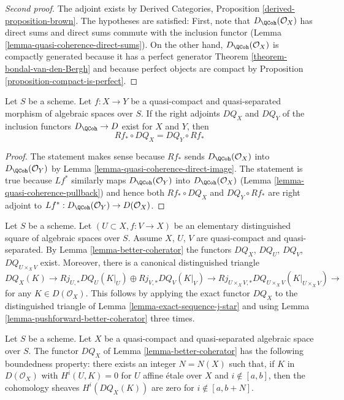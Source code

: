 \begin{proof}[Second proof]
The adjoint exists by Derived Categories, Proposition
\ref{derived-proposition-brown}. The hypotheses are satisfied:
First, note that $D_\QCoh(\mathcal{O}_X)$ has direct sums
and direct sums commute with the inclusion functor
(Lemma \ref{lemma-quasi-coherence-direct-sums}).
On the other hand, $D_\QCoh(\mathcal{O}_X)$
is compactly generated because it has a perfect
generator Theorem \ref{theorem-bondal-van-den-Bergh}
and because perfect objects are compact by
Proposition \ref{proposition-compact-is-perfect}.
\end{proof}

\begin{lemma}
\label{lemma-pushforward-better-coherator}
Let $S$ be a scheme.
Let $f : X \to Y$ be a quasi-compact and quasi-separated
morphism of algebraic spaces over $S$.
If the right adjoints $DQ_X$ and $DQ_Y$
of the inclusion functors $D_\QCoh \to D$ exist for $X$ and $Y$, then
$$
Rf_* \circ DQ_X = DQ_Y \circ Rf_*
$$
\end{lemma}

\begin{proof}
The statement makes sense because $Rf_*$ sends
$D_\QCoh(\mathcal{O}_X)$ into $D_\QCoh(\mathcal{O}_Y)$ by
Lemma \ref{lemma-quasi-coherence-direct-image}.
The statement is true because $Lf^*$ similarly maps
$D_\QCoh(\mathcal{O}_Y)$ into $D_\QCoh(\mathcal{O}_X)$
(Lemma \ref{lemma-quasi-coherence-pullback})
and hence both $Rf_* \circ DQ_X$ and $DQ_Y \circ Rf_*$
are right adjoint to $Lf^* : D_\QCoh(\mathcal{O}_Y) \to D(\mathcal{O}_X)$.
\end{proof}

\begin{remark}
\label{remark-explain-consequence}
Let $S$ be a scheme. Let $(U \subset X, f : V \to X)$ be an
elementary distinguished square of algebraic spaces over $S$.
Assume $X$, $U$, $V$ are quasi-compact and quasi-separated.
By Lemma \ref{lemma-better-coherator} the functors
$DQ_X$, $DQ_U$, $DQ_V$, $DQ_{U \times_X V}$ exist. Moreover, there is a
canonical distinguished triangle
$$
DQ_X(K) \to Rj_{U, *}DQ_U(K|_U) \oplus Rj_{V, *}DQ_V(K|_V)
\to Rj_{U \times_X V, *}DQ_{U \times_X V}(K|_{U \times_X V}) \to
$$
for any $K \in D(\mathcal{O}_X)$. This follows by applying the
exact functor $DQ_X$ to the distinguished triangle of
Lemma \ref{lemma-exact-sequence-j-star}
and using Lemma \ref{lemma-pushforward-better-coherator} three times.
\end{remark}

\begin{lemma}
\label{lemma-boundedness-better-coherator}
Let $S$ be a scheme.
Let $X$ be a quasi-compact and quasi-separated algebraic space over $S$.
The functor $DQ_X$ of Lemma \ref{lemma-better-coherator}
has the following boundedness property:
there exists an integer $N = N(X)$ such that, if
$K$ in $D(\mathcal{O}_X)$ with
$H^i(U, K) = 0$ for $U$ affine \'etale over $X$ and $i \not \in [a, b]$, then
the cohomology sheaves $H^i(DQ_X(K))$ are zero for
$i \not \in [a, b + N]$.
\end{lemma}


